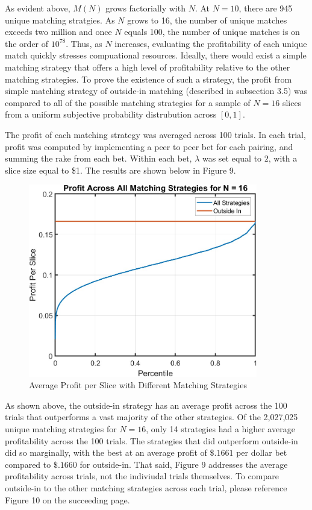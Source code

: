 \documentclass[sn-mathphys-num]{sn-jnl}
\theoremstyle{thmstyleone}%
\theoremstyle{thmstyletwo}%
\theoremstyle{thmstylethree}%
\begin{document}
As evident above, $M(N)$ grows factorially with $N$. At $N = 10$, there are 945 unique matching stratgies. As $N$ grows to 16, the number of unique matches exceeds two million and once $N$ equals 100, the number of unique matches is on the order of $10^{78}$. Thus, as $N$ increases, evaluating the profitability of each unique match quickly stresses compuational resources. Ideally, there would exist a simple matching strategy that offers a high level of profitability relative to the other matching strategies. To prove the existence of such a strategy, the profit from simple matching strategy of outside-in matching (described in subsection 3.5) was compared to all of the possible matching strategies for a sample of $N = 16$ slices from a uniform subjective probability distrubution across $[0, 1]$. 

The profit of each matching strategy was averaged across 100 trials. In each trial, profit was computed by implementing a peer to peer bet for each pairing, and summing the rake from each bet. Within each bet, $\lambda$ was set equal to $2$, with a slice size equal to \$1. The results are shown below in Figure 9.

\begin{figure}[H]
	\centering
	\includegraphics[width=10cm]{Matching Strategy Profit}
	\caption{Average Profit per Slice with Different Matching Strategies}
\end{figure}

As shown above, the outside-in strategy has an average profit across the 100 trials that outperforms a vast majority of the other strategies. Of the 2,027,025 unique matching strategies for $N =16$, only 14 strategies had a higher average profitability across the 100 trials. The strategies that did outperform outside-in  did so marginally, with the best at an average profit of $\$.1661$ per dollar bet compared to $\$.1660$ for outside-in. That said, Figure 9 addresses the average profitability across trials, not the indiviudal trials themselves. To compare outside-in to the other matching strategies across each trial, please reference Figure 10 on the succeeding page. 
\end{document}
